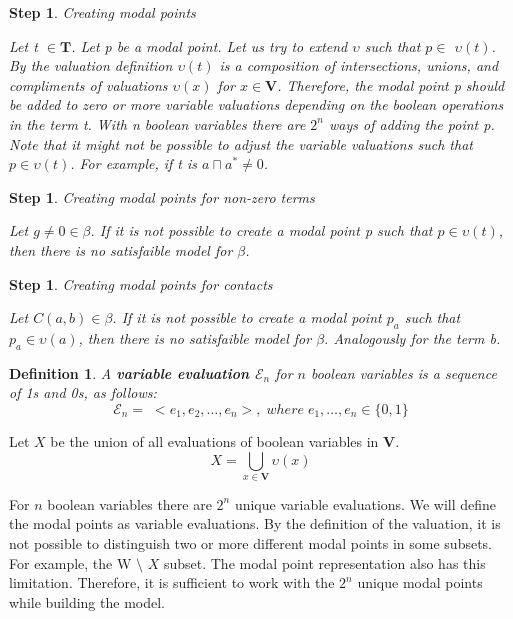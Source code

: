 \documentclass{article}
\newcommand\E{\mathcal{E}}
\newcommand\Tb{\mathbf{T}}
\newcommand\Vb{\mathbf{V}}
\newtheorem{defn}[theorem]{Definition}
\newtheorem{step}[theorem]{Step}
\begin{document}
	\begin{step} Creating modal points

		Let t $\in \Tb$. Let p be a modal point. Let us try to extend $\upsilon$ such that $p \in$ $\upsilon(t)$. By the valuation definition  $\upsilon(t)$ is a composition of intersections, unions, and compliments of valuations $\upsilon(x)$ for $x \in \Vb$. Therefore, the modal point p should be added to zero or more variable valuations depending on the boolean operations in the term t. With n boolean variables there are $2^n$ ways of adding the point p. Note that it might not be possible to adjust the variable valuations such that $p \in \upsilon(t)$. For example, if t is $a \sqcap a^* \neq 0$.
	\end{step}

	\begin{step} Creating modal points for non-zero terms

		Let $g \neq 0 \in \beta$. If it is not possible to create a modal point p such that $p \in \upsilon(t)$, then there is no satisfaible model for $\beta$.
	\end{step}

	\begin{step} Creating modal points for contacts

		Let $C(a,b) \in \beta$. If it is not possible to create a modal point $p_a$ such that $p_a \in \upsilon(a)$, then there is no satisfaible model for $\beta$. Analogously for the term b.
	\end{step}

		\begin{defn}
			A \textbf{variable evaluation $\E_n$} for $n$ boolean variables is a sequence of 1s and 0s, as follows:
			\begin{equation}
				\E_n = \; < e_1, e_2, \ldots , e_n >, \; where \; e_1, \ldots, e_n \in \{0, 1 \}
			\end{equation}
		\end{defn}

		Let $X$ be the union of all evaluations of boolean variables in $\Vb$.
		\begin{equation}
			\label{X-all-variable-valuations}
			X = \bigcup\limits_{x \in \Vb}\upsilon(x)
		\end{equation}

		For $n$ boolean variables there are $2^n$ unique variable evaluations. We will define the modal points as variable evaluations. By the definition of the valuation, it is not possible to distinguish two or more different modal points in some subsets. For example, the W $\setminus$ $X$ subset. The modal point representation also has this limitation. Therefore, it is sufficient to work with the $2^n$ unique modal points while building the model.
\end{document}
